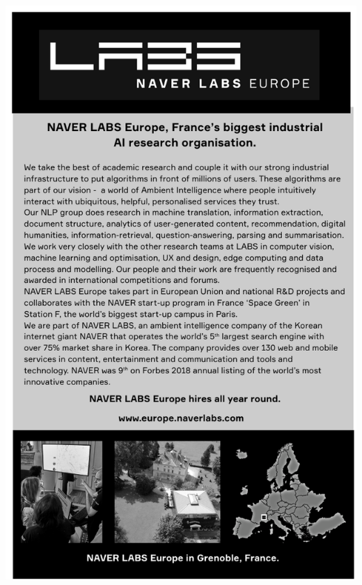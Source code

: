 \thispagestyle{empty}
\begin{center}
  \vfill
  \includegraphics[width=\textwidth]{content/ads/full/navereuro.pdf}
  \vfill
\end{center}

